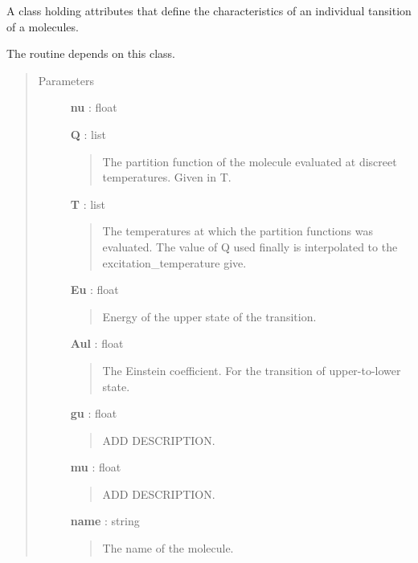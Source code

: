 \documentclass[a4paper,10pt,english]{sphinxmanual}
\begin{document}
\begin{fulllineitems}
\label{lte:astrolyze.lte.molecule_parameter.Molecule}
A class holding attributes that define the characteristics of an
individual tansition of a molecules.

The  routine
depends on this class.
\begin{quote}\begin{description}
\item[{Parameters }] \leavevmode
\textbf{nu} : float

\textbf{Q} : list
\begin{quote}

The partition function of the molecule evaluated at discreet
temperatures. Given in T.
\end{quote}

\textbf{T} : list
\begin{quote}

The temperatures at which the partition functions was evaluated. The
value of Q used finally is interpolated to the excitation\_temperature
give.
\end{quote}

\textbf{Eu} : float
\begin{quote}

Energy of the upper state of the transition.
\end{quote}

\textbf{Aul} : float
\begin{quote}

The Einstein coefficient. For the transition of upper-to-lower state.
\end{quote}

\textbf{gu} : float
\begin{quote}

ADD DESCRIPTION.
\end{quote}

\textbf{mu} : float
\begin{quote}

ADD DESCRIPTION.
\end{quote}

\textbf{name} : string
\begin{quote}

The name of the molecule.
\end{quote}

\end{description}\end{quote}

\end{fulllineitems}
\end{document}
